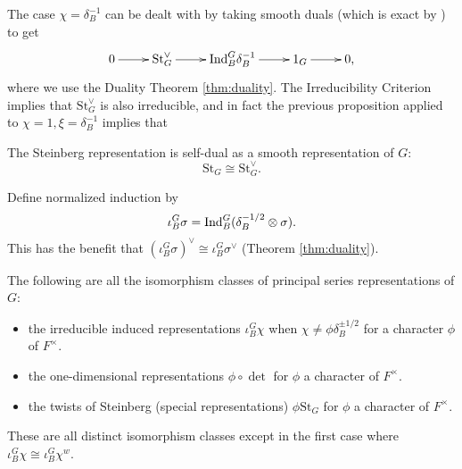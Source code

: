 The case $\chi = \delta_B^{-1}$ can be dealt with by taking smooth duals (which is exact by \cite[Lemma 2.10]{BH1}) to get 
$$\xymatrix{0 \ar[r] & \mathrm{St}_G^\vee \ar[r] & \Ind_B^G \delta_B^{-1} \ar[r] & 1_G \ar[r] & 0,}$$ where we use the Duality Theorem \ref{thm:duality}. The Irreducibility Criterion implies that $\mathrm{St}_G^\vee$ is also irreducible, and in fact the previous proposition applied to $\chi=1, \xi = \delta_B^{-1}$ implies that

\begin{cor}\label{cor:selfdual}
    The Steinberg representation is self-dual as a smooth representation of $G$:
    $$\mathrm{St}_G \cong \mathrm{St}_G^\vee.$$
\end{cor}


\begin{notn}
    Define normalized induction by
    $$\iota_B^G \sigma = \mathrm{Ind}_B^G (\delta_B^{-1/2} \otimes \sigma).$$
    This has the benefit that $(\iota_B^G \sigma)^\vee \cong \iota_B^G \sigma^\vee$ (Theorem \ref{thm:duality}).
\end{notn}

\begin{thm}\label{classify}
    The following are all the isomorphism classes of principal series representations of $G$:
    \begin{itemize}
        \item the irreducible induced representations $\iota_B^G \chi$ when $\chi \neq \phi \delta_B^{\pm 1/2}$ for a character $\phi$ of $F^\times$.
        \item the one-dimensional representations $\phi \circ \det$ for $\phi$ a character of $F^\times$.
        \item the twists of Steinberg (special representations) $\phi \mathrm{St}_G$ for $\phi$ a character of $F^\times$.
    \end{itemize}
    These are all distinct isomorphism classes except in the first case where $\iota_B^G \chi \cong \iota_B^G \chi^w$.
\end{thm}

\newpage